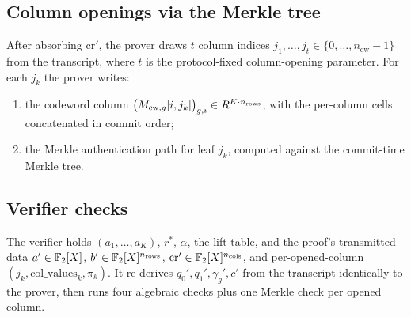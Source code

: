 \subsection{Column openings via the Merkle tree}

After absorbing $\mathrm{cr}'$, the prover draws $t$ column indices
$j_1, \ldots, j_t \in \{0, \ldots, n_{\mathrm{cw}} - 1\}$ from the
transcript, where $t$ is the protocol-fixed column-opening parameter.
For each $j_k$ the prover writes:
\begin{enumerate}[leftmargin=2em]
  \item the codeword column $\big(M_{\mathrm{cw}, g}[i, j_k]\big)_{g, i}
    \in R^{K \cdot n_{\mathrm{rows}}}$, with the per-column
    cells concatenated in commit order;
  \item the Merkle authentication path for leaf $j_k$, computed against
    the commit-time Merkle tree.
\end{enumerate}

\subsection{Verifier checks}
\label{sec:checks}

The verifier holds $(a_1, \ldots, a_K)$, $r^*$, $\alpha$, the lift
table, and the proof's transmitted data $a' \in \mathbb{F}_2[X]$, $b' \in
\mathbb{F}_2[X]^{n_{\mathrm{rows}}}$, $\mathrm{cr}' \in
\mathbb{F}_2[X]^{n_{\mathrm{cols}}}$, and per-opened-column $(j_k, \mathrm{col\_values}_k,
\pi_k)$. It re-derives $q_0', q_1', \gamma_g', c'$ from the
transcript identically to the prover, then runs four algebraic checks
plus one Merkle check per opened column.

